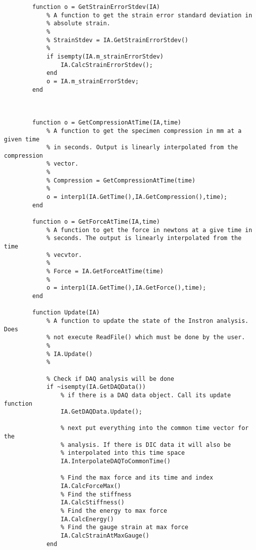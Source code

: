 \begin{lstlisting}
        function o = GetStrainErrorStdev(IA)
            % A function to get the strain error standard deviation in
            % absolute strain.
            %
            % StrainStdev = IA.GetStrainErrorStdev()
            %
            if isempty(IA.m_strainErrorStdev)
                IA.CalcStrainErrorStdev();
            end
            o = IA.m_strainErrorStdev;
        end
        


        function o = GetCompressionAtTime(IA,time)
            % A function to get the specimen compression in mm at a given time 
            % in seconds. Output is linearly interpolated from the compression
            % vector.
            %
            % Compression = GetCompressionAtTime(time)
            %
            o = interp1(IA.GetTime(),IA.GetCompression(),time);
        end
        
        function o = GetForceAtTime(IA,time)
            % A function to get the force in newtons at a give time in
            % seconds. The output is linearly interpolated from the time
            % vecvtor.
            %
            % Force = IA.GetForceAtTime(time)
            %
            o = interp1(IA.GetTime(),IA.GetForce(),time);
        end
                
        function Update(IA)
            % A function to update the state of the Instron analysis. Does
            % not execute ReadFile() which must be done by the user.
            %
            % IA.Update()
            %
            
            % Check if DAQ analysis will be done
            if ~isempty(IA.GetDAQData())
                % if there is a DAQ data object. Call its update function
                IA.GetDAQData.Update();
                   
                % next put everything into the common time vector for the
                % analysis. If there is DIC data it will also be
                % interpolated into this time space
                IA.InterpolateDAQToCommonTime()
                
                % Find the max force and its time and index
                IA.CalcForceMax()
                % Find the stiffness
                IA.CalcStiffness()
                % Find the energy to max force
                IA.CalcEnergy()
                % Find the gauge strain at max force
                IA.CalcStrainAtMaxGauge()
            end
            

\end{lstlisting}
